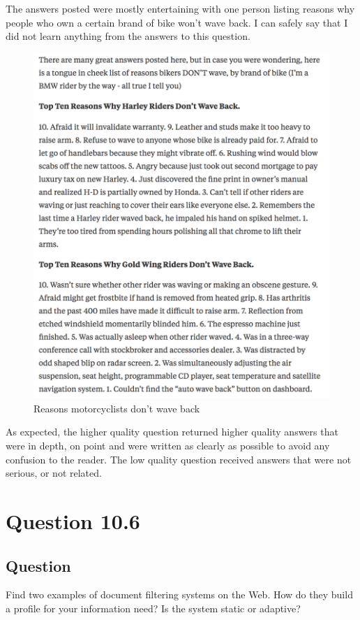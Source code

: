 \documentclass[10pt,letterpaper,bibliography=totoc]{scrartcl}
\begin{document}
The answers posted were mostly entertaining with one person listing reasons why people who own a certain brand of bike won't wave back. I can safely say that I did not learn anything from the answers to this question.

\begin{figure}[h!]
\centering
\label{fig:reasons_wave}
\includegraphics[scale=.5]{reasons.png}
\caption{Reasons motorcyclists don't wave back}
\end{figure}

As expected, the higher quality question returned higher quality answers that were in depth, on point and were written as clearly as possible to avoid any confusion to the reader. The low quality question received answers that were not serious, or not related. 

\section{Question 10.6}
\subsection {Question}
Find two examples of document filtering systems on the Web. How do they build a profile for your information need? Is the system static or adaptive?
\end{document}
